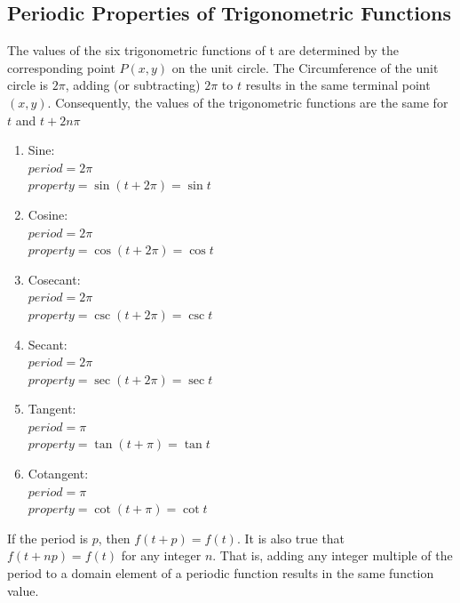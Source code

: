 \documentclass{article}
\begin{document}
\subsection{Periodic Properties of Trigonometric Functions}
The values of the six trigonometric functions of t are determined by
the corresponding point $P(x,y)$ on the unit circle. The Circumference of the
unit circle is $2\pi$, adding (or subtracting) $2\pi$ to $t$ results
in the same terminal point $(x,y)$. Consequently, the values of the
trigonometric functions are the same for $t$ and $t+2n\pi$
\begin{enumerate}
  \item Sine:\\
    $period=2\pi$\\
    $property=\sin(t+2\pi)=\sin t$\\
  
  \item Cosine:\\
    $period=2\pi$\\
    $property=\cos(t+2\pi)=\cos t$\\

  \item Cosecant:\\
    $period=2\pi$\\
    $property=\csc(t+2\pi)=\csc t$\\

  \item Secant:\\
    $period=2\pi$\\
    $property=\sec(t+2\pi)=\sec t$\\

  \item Tangent:\\
    $period=\pi$\\
    $property=\tan(t+\pi)=\tan t$\\

  \item Cotangent:\\
    $period=\pi$\\
    $property=\cot(t+\pi)=\cot t$\\
\end{enumerate}
If the period is $p$, then $f(t+p)=f(t)$. It is also true that $f(t+np)=f(t)$
for any integer $n$. That is, adding any integer multiple of the period to a
domain element of a periodic function results in the same function value.
\end{document}

